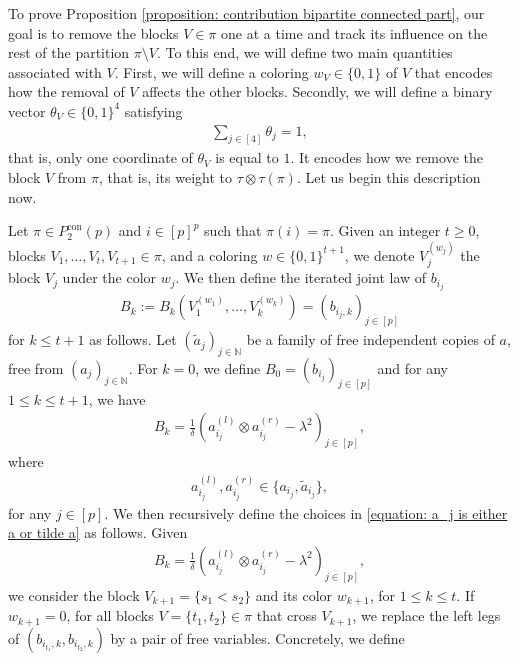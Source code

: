 \documentclass[12pt,reqno]{amsart}
\theoremstyle{plain}
\newcommand{\1}{\mathbf{1}}
\newcommand{\N}{\mathbb{N}}
\begin{document}
To prove Proposition \ref{proposition: contribution bipartite connected part}, our goal is to remove the blocks $V \in \pi$ one at a time and track its influence on the rest of the partition $\pi\setminus V$. To this end, we will define two main quantities associated with $V$. First, we will define a coloring $w_V \in \{0,1\}$ of $V$ that encodes how the removal of $V$ affects the other blocks. Secondly, we will define a binary vector $\theta_V \in \{0,1\}^4$ satisfying
\begin{align*}
    \sum_{j\in[4]} \theta_j=1,
\end{align*}
that is, only one coordinate of $\theta_V$ is equal to $1$. It encodes how we remove the block $V$ from $\pi$, that is, its weight to $\tau\otimes\tau(\pi)$. Let us begin this description now.

Let $\pi \in P_2^{\operatorname{con}}(p)$ and $i \in [p]^p$ such that $\pi(i)=\pi$. Given an integer $t \ge 0$,  blocks $V_1,\ldots,V_t,V_{t+1} \in \pi$, and a coloring $w \in \{0,1\}^{t+1}$, we denote $V_j^{(w_j)}$ the block $V_j$ under the color $w_j$. We then define the iterated joint law of $b_{i_j}$
\begin{align*}
    B_k:=B_k\left(V_1^{(w_1)},\ldots, V_k^{(w_k)}\right)=\left(b_{i_j,k}\right)_{j \in [p]}
\end{align*}
for $k \le t+1$ as follows. Let $(\tilde{a}_j)_{j \in \N}$ be a family of free independent copies of $a$, free from $(a_j)_{j \in \N}$. For $k=0$, we define $B_0=(b_{i_j})_{j \in [p]}$ and for any $1 \le k \le t+1$, we have
\begin{align*}
    B_k=\frac{1}{\delta}\left(a_{i_j}^{(l)}\otimes a_{i_j}^{(r)}-\lambda^2\right)_{j \in [p]},
\end{align*}
where
\begin{align}\label{equation: a_j is either a or tilde a}
    a_{i_j}^{(l)},a_{i_j}^{(r)} \in \{a_{i_j},\tilde{a}_{i_j}\},
\end{align}
for any $j \in [p]$. We then recursively define the choices in \eqref{equation: a_j is either a or tilde a} as follows. Given 
\begin{align*}
    B_k=\frac{1}{\delta}\left(a_{i_j}^{(l)}\otimes a_{i_j}^{(r)}-\lambda^2\right)_{j \in [p]},
\end{align*}
we consider the block $V_{k+1}=\{s_1<s_2\}$ and its color $w_{k+1}$, for $1 \le k \le t$. If $w_{k+1}=0$, for all blocks $V=\{t_1,t_2\} \in \pi$ that cross $V_{k+1}$, we replace the left legs of $(b_{i_{t_1},k},b_{i_{t_2},k})$ by a pair of free variables. Concretely, we define
\end{document}
